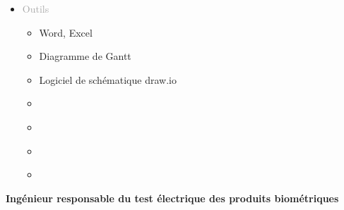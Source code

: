 \documentclass{article}
\begin{document}
\begin{tabular}
\begin{itemize}
        \setlength{\itemsep}{10pt}
        \item \textcolor{darkGray}{Outils}
        \begin{itemize}
        [label={\textcolor{gray!80}{\checkmark}}, topsep=8pt, partopsep=0pt, itemsep=0.5pt, parsep=2pt,after=\vspace*{-\baselineskip}] 
            \item \textcolor{gray!80}{Word, Excel}
            \item \textcolor{gray!80}{Diagramme de Gantt}
            \item \textcolor{gray!80}{Logiciel de schématique draw.io}
            \item[\textcolor{white}{\checkmark}] \textcolor{gray!80}{} %
            \item[\textcolor{white}{\checkmark}] \textcolor{gray!80}{} %
            \item[\textcolor{white}{\checkmark}] \textcolor{gray!80}{} %
            \item[\textcolor{white}{\checkmark}] \textcolor{gray!80}{} %
        \end{itemize}
    \end{itemize}
\end{tabular}

\vfill %


\newpage
\thispagestyle{pro_experience_linxens}

\vspace*{0cm}

\vfill %

\begin{center}
    \textcolor{secondaryBlue}{\textbf{Ingénieur responsable du test électrique des produits biométriques}}
\end{center}
\end{document}
